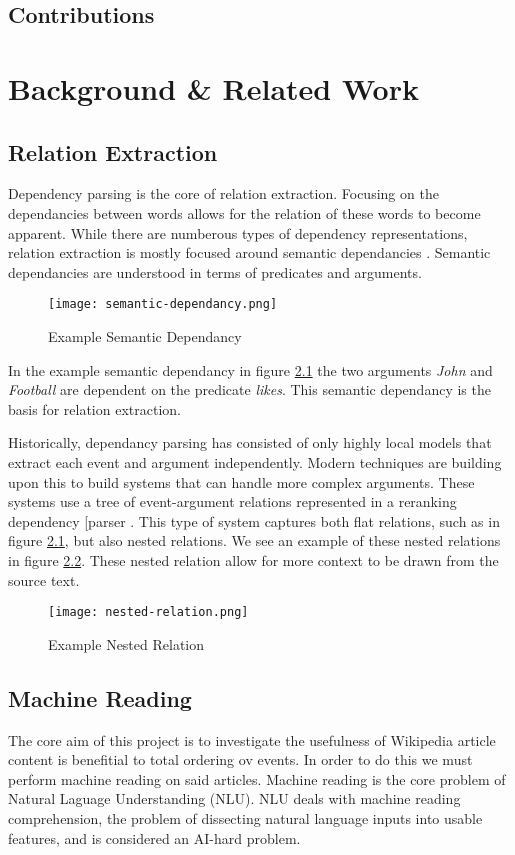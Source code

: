 \documentclass[bsc,frontabs,twoside,singlespacing,parskip,deptreport]{infthesis}     %
\begin{document}
\section{Contributions}

\chapter{Background \& Related Work}


\section{Relation Extraction}
Dependency parsing is the core of relation extraction. Focusing on the dependancies between words allows for the relation of these words to become apparent.
While there are numberous types of dependency representations, relation extraction is mostly focused around semantic dependancies \cite{mcclosky2011event}.
Semantic dependancies are understood in terms of predicates and arguments.
\begin{figure}[H]
  \centering
  \texttt{[image: semantic-dependancy.png]}
  \caption{Example Semantic Dependancy}
  \label{fig:semantic-dependancy}
\end{figure}

In the example semantic dependancy in figure \ref{fig:semantic-dependancy} the two arguments \textit{John} and \textit{Football} are dependent
on the predicate \textit{likes}. This semantic dependancy is the basis for relation extraction.


Historically, dependancy parsing has consisted of only highly local models that extract each event and argument independently.
Modern techniques are building upon this to build systems that can handle more complex arguments. These systems use a tree of
event-argument relations represented in a reranking dependency [parser \cite{mcclosky2011event}.
This type of system captures both flat relations, such as in figure \ref{fig:semantic-dependancy}, but also nested relations.
We see an example of these nested relations in figure \ref{fig:nested-relation}. These nested relation allow for more context to be drawn from
the source text.

\begin{figure}[H]
  \centering
  \texttt{[image: nested-relation.png]}
  \caption{Example Nested Relation}
  \label{fig:nested-relation}
\end{figure}


\section{Machine Reading}
The core aim of this project is to investigate the usefulness of Wikipedia article content is benefitial to total ordering ov events.
In order to do this we must perform machine reading on said articles.
Machine reading is the core problem of Natural Laguage Understanding (NLU).
NLU deals with machine reading comprehension, the problem of dissecting natural language inputs into usable features,
and is considered an AI-hard problem.
\end{document}
